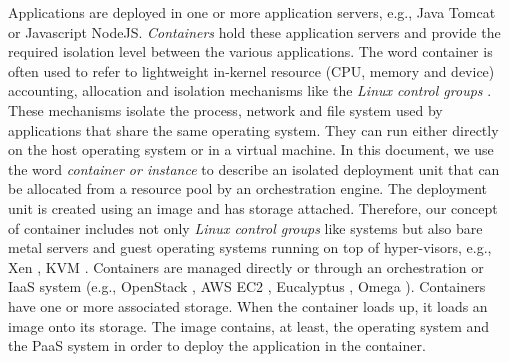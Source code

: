 Applications are deployed in one or more application servers, e.g., Java Tomcat or Javascript NodeJS. \emph{Containers} \cite{Lenk2009} hold these application servers and provide the required isolation level between the various applications. The word container is often used to refer to lightweight in-kernel resource (CPU, memory and device) accounting, allocation and isolation mechanisms like the \textit{Linux control groups} \cite{Menage2007}. These mechanisms isolate the process, network and file system used by applications that share the same operating system. They can run either directly on the host operating system or in a virtual machine. In this document, we use the word \textit{container or instance} to describe an isolated deployment unit that can be allocated from a resource pool by an orchestration engine. The deployment unit is created using an image and has storage attached. Therefore, our concept of container includes not only \textit{Linux control groups} like systems but also bare metal servers and guest operating systems running on top of hyper-visors, e.g., Xen \cite{xen}, KVM \cite{kvm}. Containers are managed directly or through an orchestration or IaaS system (e.g., OpenStack \cite{openstack}, \ac{AWS} \ac{EC2} \cite{aws}, Eucalyptus \cite{eucalyptus}, Omega \cite{omega}). Containers have one or more associated storage. When the container loads up, it loads an image onto its storage. The image contains, at least, the operating system and the \ac{PaaS} system in order to deploy the application in the container. 

